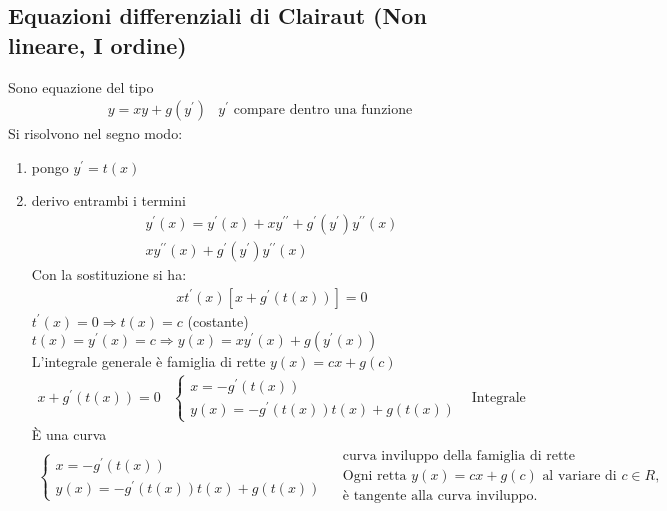 \subsection{Equazioni differenziali di Clairaut (Non lineare, I ordine)}
Sono equazione del tipo
\begin{eqnarray*}
	y=xy+g(y^\prime) &y^\prime \text{ compare dentro una funzione}
\end{eqnarray*}
Si risolvono nel segno modo:
\begin{enumerate}
	\item pongo $y^\prime =t(x)$ 
	\item derivo entrambi i termini 
		\begin{eqnarray*}
			y^\prime(x)=y^\prime(x)+xy^{\prime\prime}+g^\prime (y^\prime)
			y^{\prime\prime}(x)\\
			xy^{\prime\prime}(x)+g^\prime(y^\prime)y^{\prime\prime}(x)
		\end{eqnarray*}
		Con la sostituzione si ha:
		\begin{eqnarray*}
			xt^\prime(x)[x+g^\prime(t(x))] =0
		\end{eqnarray*}
		$t^\prime(x)=0\Rightarrow t(x)=c$ (costante)
		$t(x)=y^\prime(x)=c\Rightarrow y(x)=xy^\prime(x)+g(y^\prime(x))$\\
		L'integrale generale è famiglia di rette $y(x)=cx+g(c)$
		\begin{eqnarray*}
			x+g^{\prime}(t(x))=0 & \begin{cases}
				x=-g^\prime(t(x))\\
				y(x)=-g^\prime(t(x))t(x)+g(t(x))
			\end{cases} & \text{Integrale singolare}
		\end{eqnarray*}
		È una curva
		\begin{eqnarray*}
			\begin{cases}
				x=-g^\prime(t(x))\\
				y(x)=-g^\prime(t(x))t(x)+g(t(x))
			\end{cases} & \begin{matrix}
                                        \text{curva inviluppo della famiglia di rette}\\
                                        \text{Ogni retta $y(x)=cx+g(c)$ al variare di $c\in R$,}\\
                                        \text{è tangente alla curva inviluppo.}
			\end{matrix}
		\end{eqnarray*}
                \begin{esempio}

\end{esempio}
\end{enumerate}
